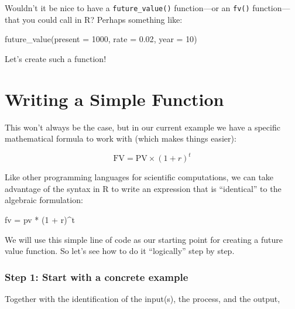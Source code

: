 \documentclass[
]{book}
\newenvironment{Shaded}{\begin{snugshade}}{\end{snugshade}}
\newcommand{\AttributeTok}[1]{\textcolor[rgb]{0.77,0.63,0.00}{#1}}
\newcommand{\DecValTok}[1]{\textcolor[rgb]{0.00,0.00,0.81}{#1}}
\newcommand{\FloatTok}[1]{\textcolor[rgb]{0.00,0.00,0.81}{#1}}
\newcommand{\FunctionTok}[1]{\textcolor[rgb]{0.00,0.00,0.00}{#1}}
\newcommand{\NormalTok}[1]{#1}
\newcommand{\OtherTok}[1]{\textcolor[rgb]{0.56,0.35,0.01}{#1}}
\newcommand{\SpecialCharTok}[1]{\textcolor[rgb]{0.00,0.00,0.00}{#1}}
\begin{document}
Wouldn't it be nice to have a \texttt{future\_value()} function---or an \texttt{fv()}
function---that you could call in R? Perhaps something like:

\begin{Shaded}
\begin{Highlighting}[]
\FunctionTok{future\_value}\NormalTok{(}\AttributeTok{present =} \DecValTok{1000}\NormalTok{, }\AttributeTok{rate =} \FloatTok{0.02}\NormalTok{, }\AttributeTok{year =} \DecValTok{10}\NormalTok{)}
\end{Highlighting}
\end{Shaded}

Let's create such a function!

\hypertarget{writing-a-simple-function}{%
\section{Writing a Simple Function}\label{writing-a-simple-function}}

This won't always be the case, but in our current example we have a specific
mathematical formula to work with (which makes things easier):

\[
\text{FV} = \text{PV} \times (1 + r)^t
\]

Like other programming languages for scientific computations, we can take
advantage of the syntax in R to write an expression that is ``identical'' to
the algebraic formulation:

\begin{Shaded}
\begin{Highlighting}[]
\NormalTok{fv }\OtherTok{=}\NormalTok{ pv }\SpecialCharTok{*}\NormalTok{ (}\DecValTok{1} \SpecialCharTok{+}\NormalTok{ r)}\SpecialCharTok{\^{}}\NormalTok{t}
\end{Highlighting}
\end{Shaded}

We will use this simple line of code as our starting point for creating a
future value function. So let's see how to do it ``logically'' step by step.

\hypertarget{step-1-start-with-a-concrete-example}{%
\subsubsection*{Step 1: Start with a concrete example}\label{step-1-start-with-a-concrete-example}}

Together with the identification of the input(s), the process, and the
output,
\end{document}
